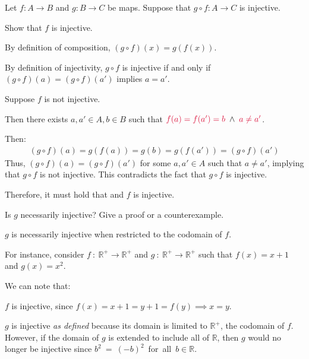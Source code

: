 
\begin{problem}
  Let $f \colon A \to B$ and $g \colon B \to C$ be maps.
  Suppose that $g\circ f
  \colon A \to C$ is injective.  
  \begin{enumalph}
  \item Show that $f$ is injective.
  \begin{Answer}
    By definition of composition, $(g\circ f)(x) = g(f(x))$.

    \noindent
    By definition of injectivity, $g \circ f$ is injective if and only if
    $(g\circ f)(a) = (g\circ f)(a')$ implies $a = a'$.

    \noindent
    Suppose $f$ is not injective.
    
    \noindent
    Then there exists $a, a' \in A, b \in B$ such that $\crim{f(a) = f(a') = b}\; \land \; \crim{a \neq a'}$.
    
    \noindent
    Then:
    \begin{align*}
      (g \circ f)(a) = g(f(a)) = g(b) = g(f(a')) = (g \circ f)(a')
    \end{align*}
    \noindent
    Thus, $(g \circ f) (a) = (g \circ f) (a')$ for some $a, a' \in A$ such that $a \neq a'$, implying that
    $g \circ f$ is not injective.
    This contradicts the fact that $g \circ f$ is injective.

    \noindent
    Therefore, it must hold that  and $f$ is injective.
  \end{Answer}
  \item Is $g$ necessarily injective?  Give a proof or a counterexample.
  \begin{Answer}
    $g$ is necessarily injective when restricted to the codomain of $f$.

    \noindent
    For instance, consider $f\ \colon\ \mathbb{R}^{+} \to \mathbb{R}^{+}$
    and $g\ \colon\ \mathbb{R}^{+} \to \mathbb{R}^{+}$
    such that $f(x) = x + 1$ and $g(x) = x^2$.

    \noindent
    We can note that:
    \begin{enumalph}
      \item $f$ is injective, since $f(x) = x + 1 = y + 1 = f(y) \implies x = y$.
      \item $g$ is injective \textit{as defined} because its domain is limited to $\mathbb{R}^{+}$,
        the codomain of $f$.
        However, if the domain of $g$ is extended to include all of $\mathbb{R}$,
        then $g$ would no longer be injective since
        $b^{2}~=~{(-b)}^{2}$~for~all~$b \in \mathbb{R}$.
    \end{enumalph}
    
  \end{Answer}
  \end{enumalph}
  \end{problem}



  